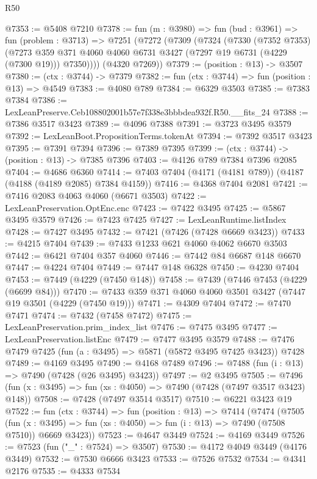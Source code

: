 \begin{lexlean}{R50}
\begin{coremodule}
@7353 := @5408 @7210
@7378 := fun (m : @3980) =>
  fun (bud : @3961) =>
  fun (problem : @3713) =>
  @7251
    (@7272
      (@7309
        (@7324
          (@7330
            (@7352 @7353)
            (@7273 @359 @371 @4060 @4060 @6731 @3427 (@7297 @19 @6731 (@4229 (@7300 @19))) @7350))))
      (@4320 @7269))
@7379 := (position : @13) -> @3507
@7380 := (ctx : @3744) -> @7379
@7382 := fun (ctx : @3744) => fun (position : @13) => @4549
@7383 := @4080 @789
@7384 := @6329 @3503
@7385 := @7383 @7384
@7386 := LexLeanPreserve.Ceb108802001b57e7f338e3bbbdea932f.R50.__fits_24
@7388 := @7386 @3517 @3423
@7389 := @4096 @7388
@7391 := @3723 @3495 @3579
@7392 := LexLeanBoot.PropositionTerms.tokenAt
@7394 := @7392 @3517 @3423
@7395 := @7391 @7394
@7396 := @7389 @7395
@7399 := (ctx : @3744) -> (position : @13) -> @7385 @7396
@7403 := @4126 @789 @7384 @7396 @2085
@7404 := @4686 @6360
@7414 := @7403 @7404 (@4171 (@4181 @789)) (@4187 (@4188 (@4189 @2085) @7384 @4159))
@7416 := @4368 @7404 @2081
@7421 := @7416 @2083 @4063 @4060 (@6671 @3503)
@7422 := LexLeanPreservation.OptEnc.enc
@7423 := @7422 @3495
@7425 := @5867 @3495 @3579
@7426 := @7423 @7425
@7427 := LexLeanRuntime.listIndex
@7428 := @7427 @3495
@7432 := @7421 (@7426 (@7428 @6669 @3423))
@7433 := @4215 @7404
@7439 := @7433 @1233 @621 @4060 @4062 @6670 @3503
@7442 := @6421 @7404 @357 @4060
@7446 := @7442 @84 @6687 @148 @6670
@7447 := @4224 @7404
@7449 := @7447 @148 @6328
@7450 := @4230 @7404
@7453 := @7449 (@4229 (@7450 @148))
@7458 := @7439 (@7446 @7453 (@4229 (@6699 @84)))
@7470 := @7433 @359 @371 @4060 @4060 @3501 @3427 (@7447 @19 @3501 (@4229 (@7450 @19)))
@7471 := @4309 @7404
@7472 := @7470 @7471
@7474 := @7432 (@7458 @7472)
@7475 := LexLeanPreservation.prim_index_list
@7476 := @7475 @3495
@7477 := LexLeanPreservation.listEnc
@7479 := @7477 @3495 @3579
@7488 := @7476 @7479 @7425 (fun (a : @3495) => @5871 (@5872 @3495 @7425 @3423)) @7428
@7489 := @4169 @3495
@7490 := @4168 @7489
@7496 := @7488 (fun (i : @13) => @7490 (@7428 (@26 @3495) @3423))
@7497 := @2 @3495
@7505 := @7496 (fun (x : @3495) => fun (xs : @4050) => @7490 (@7428 (@7497 @3517 @3423) @148))
@7508 := @7428 (@7497 @3514 @3517)
@7510 := @6221 @3423 @19
@7522 := fun (ctx : @3744) =>
  fun (position : @13) =>
  @7414
    (@7474
      (@7505
        (fun (x : @3495) => fun (xs : @4050) => fun (i : @13) => @7490 (@7508 @7510))
        @6669
        @3423))
@7523 := @4647 @3449
@7524 := @4169 @3449
@7526 := @7523 (fun ("_" : @7524) => @3507)
@7530 := @4172 @4049 @3449 (@4176 @3449)
@7532 := @7530 @6666 @3423
@7533 := @7526 @7532
@7534 := @4341 @2176
@7535 := @4333 @7534

\end{coremodule}
\end{lexlean}
